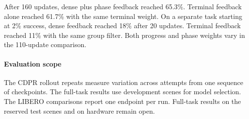 After 160 updates, dense plus phase feedback reached 65.3\%. Terminal feedback alone reached 61.7\% with the same terminal weight. On a separate task starting at 2\% success, dense feedback reached 18\% after 20 updates. Terminal feedback reached 11\% with the same group filter. Both progress and phase weights vary in the 110-update comparison.

\paragraph{Evaluation scope}
The CDPR rollout repeats measure variation across attempts from one sequence of checkpoints. The full-task results use development scenes for model selection. The LIBERO comparisons report one endpoint per run. Full-task results on the reserved test scenes and on hardware remain open.
